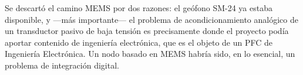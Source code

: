 Se descart\'o el camino MEMS por dos razones: el ge\'ofono SM-24 ya estaba disponible, y
---m\'as importante--- el problema de acondicionamiento anal\'ogico de un transductor
pasivo de baja tensi\'on es precisamente donde el proyecto pod\'ia aportar contenido de
ingenier\'ia electr\'onica, que es el objeto de un PFC de Ingenier\'ia Electr\'onica. Un nodo
basado en MEMS habr\'ia sido, en lo esencial, un problema de integraci\'on digital.

